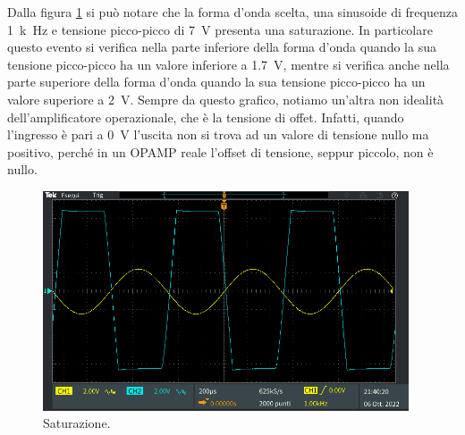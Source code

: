 \documentclass{report}
\begin{document}
Dalla figura \ref{figura:satur} si può notare che la forma d'onda scelta, una sinusoide di frequenza \SI{1}{k\hertz} e tensione picco-picco di \SI{7}{\volt} presenta una saturazione. In particolare questo evento si verifica nella parte inferiore della forma d'onda quando la sua tensione picco-picco ha un valore inferiore a \SI{1.7}{\volt}, mentre si verifica anche nella parte superiore della forma d'onda quando la sua tensione picco-picco ha un valore superiore a \SI{2}{\volt}. Sempre da questo grafico, notiamo un'altra non idealità dell'amplificatore operazionale, che è la tensione di offet. Infatti, quando l'ingresso è pari a \SI{0}{\volt} l'uscita non si trova ad un valore di tensione nullo ma positivo, perché in un OPAMP reale l'offset di tensione, seppur piccolo, non è nullo. %
\begin{figure}[h!]
	\centering
	\includegraphics[height=6.5cm]{immagini/TEK00015}
	\caption{Saturazione.}
	\label{figura:satur}
\end{figure}



\end{document}
